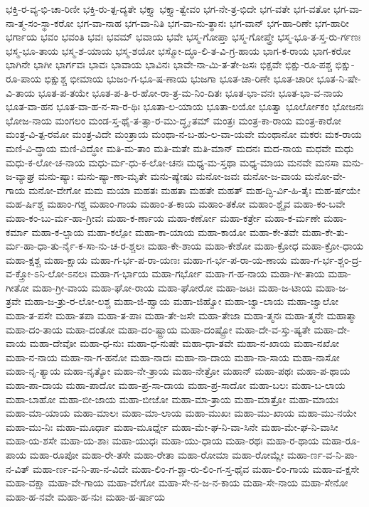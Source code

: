 {ಭಕ್ತಿ-ರ-ವ್ಯ-ಭಿ-ಚಾ-ರಿಣೀ
ಭಕ್ತಿ-ರು-ತ್ಪ-ದ್ಯತೇ
ಭಕ್ತ್ಯಾ
ಭಕ್ತ್ಯಾ-ತ್ವೇವಂ
ಭಗ-ನೇ-ತ್ರ-ಭಿದೇ
ಭಗ-ವತೇ
ಭಗ-ವತೋ
ಭಗ-ವಾ-ನಾ-ತ್ಮ-ಸಂ-ಸ್ಥಾ-ಕರೋ
ಭಗ-ವಾ-ನಾಹ
ಭಗ-ವಾ-ನಿತಿ
ಭಗ-ವಾ-ನು-ತ್ಥಾನಃ
ಭಗ-ವಾನ್
ಭಗ-ಹಾ-ರಿಣೇ
ಭಗ-ಹಾರೀ
ಭರ್ಗಾಯ
ಭವಂ
ಭವಂತಿ
ಭವಃ
ಭವಮ್
ಭವಾಯ
ಭವೇ
ಭಸ್ಮ-ಗೋಪ್ತಾ
ಭಸ್ಮ-ಗೋಪ್ತ್ರೇ
ಭಸ್ಮ-ಭೂ-ತ-ಸ್ತ-ರು-ರ್ಗಣಃ
ಭಸ್ಮ-ಭೂ-ತಾಯ
ಭಸ್ಮ-ಶ-ಯಾಯ
ಭಸ್ಮ-ಶಯೋ
ಭಸ್ಮೋ-ದ್ಧೂ-ಲಿ-ತ-ವಿ-ಗ್ರ-ಹಾಯ
ಭಾಗ-ಕ-ರಾಯ
ಭಾಗ-ಕರೋ
ಭಾಗಿನೇ
ಭಾಗೀ
ಭಾರ್ಗವಃ
ಭಾವಃ
ಭಾವಾಯ
ಭಾವಿನಃ
ಭಾವೇ-ನಾ-ಮಿ-ತ-ತೇ-ಜಸಃ
ಭಿಕ್ಷವೇ
ಭಿಕ್ಷು-ರೂ-ಪಶ್ಚ
ಭಿಕ್ಷು-ರೂ-ಪಾಯ
ಭಿಕ್ಷುಶ್ಚ
ಭೀಮಾಯ
ಭುಜಂ-ಗ-ಭೂ-ಷ-ಣಾಯ
ಭುಜಗಾ
ಭೂತ-ಚಾ-ರಿಣೇ
ಭೂತ-ಚಾರೀ
ಭೂತ-ನಿ-ಷೇ-ವಿ-ತಾಯ
ಭೂತ-ಪ-ತಯೇ
ಭೂತ-ಪ-ತಿ-ರ-ಹೋ-ರಾ-ತ್ರ-ಮ-ನಿಂ-ದಿತಃ
ಭೂತ-ಭಾ-ವನಃ
ಭೂತ-ಭಾ-ವ-ನಾಯ
ಭೂತ-ವಾ-ಹನ
ಭೂತ-ವಾ-ಹ-ನ-ಸಾ-ರ-ಥಿಃ
ಭೂತಾ-ಲ-ಯಾಯ
ಭೂತಾ-ಲಯೋ
ಭೂತ್ವಾ
ಭೂರ್ಲೋಕಂ
ಭೋಜನಃ
ಭೋಜ-ನಾಯ
ಮಂಗಲಂ
ಮಂಡ-ಸ್ತ-ಥೈ-ತ-ತ್ಸಾ-ರ-ಮು-ದ್ಧೃ-ತಮ್
ಮಂತ್ರಃ
ಮಂತ್ರ-ಕಾ-ರಾಯ
ಮಂತ್ರ-ಕಾರೋ
ಮಂತ್ರ-ವಿ-ತ್ಪ-ರಮೋ
ಮಂತ್ರ-ವಿದೇ
ಮಂತ್ರಾಯ
ಮಂಥಾ-ನ-ಬ-ಹು-ಲ-ವಾ-ಯವೇ
ಮಂಥಾನೋ
ಮಕರಃ
ಮಕ-ರಾಯ
ಮಣಿ-ವಿ-ದ್ಧಾಯ
ಮಣಿ-ವಿದ್ಧೋ
ಮತಿ-ಮ-ತಾಂ
ಮತಿ-ಮತೇ
ಮತಿ-ಮಾನ್
ಮದನಃ
ಮದ-ನಾಯ
ಮಧವೇ
ಮಧು
ಮಧು-ಕ-ಲೋ-ಚ-ನಾಯ
ಮಧು-ರ್ಮ-ಧು-ಕ-ಲೋ-ಚನಃ
ಮಧ್ಯ-ಮ-ಸ್ತಥಾ
ಮಧ್ಯ-ಮಾಯ
ಮನವೇ
ಮನಸಾ
ಮನು-ಜ-ವ್ಯಾಘ್ರ
ಮನು-ಷ್ಯಾಃ
ಮನು-ಷ್ಯಾ-ಣಾ-ಮೃತೇ
ಮನು-ಷ್ಯೇಷು
ಮನೋ-ಜವಃ
ಮನೋ-ಜ-ವಾಯ
ಮನೋ-ವೇ-ಗಾಯ
ಮನೋ-ವೇಗೋ
ಮಮ
ಮಯಾ
ಮಹತಃ
ಮಹತಾ
ಮಹತೇ
ಮಹತ್
ಮಹ-ದ್ಭಿ-ರ್ವಿ-ಹಿ-ತೈಃ
ಮಹ-ರ್ಷಯೇ
ಮಹ-ರ್ಷಿಶ್ಚ
ಮಹಾಂ-ಗಶ್ಚ
ಮಹಾಂ-ಗಾಯ
ಮಹಾಂ-ತ-ಕಾಯ
ಮಹಾಂ-ತಕೋ
ಮಹಾಂ-ಶ್ಚೈವ
ಮಹಾ-ಕಂ-ಬವೇ
ಮಹಾ-ಕಂ-ಬು-ರ್ಮ-ಹಾ-ಗ್ರೀವಃ
ಮಹಾ-ಕ-ರ್ಣಾಯ
ಮಹಾ-ಕರ್ಣೋ
ಮಹಾ-ಕರ್ತ್ರೇ
ಮಹಾ-ಕ-ರ್ಮಣೇ
ಮಹಾ-ಕರ್ಮಾ
ಮಹಾ-ಕ-ಲ್ಪಾಯ
ಮಹಾ-ಕಲ್ಪೋ
ಮಹಾ-ಕಾ-ಯಾಯ
ಮಹಾ-ಕಾಯೋ
ಮಹಾ-ಕೇ-ತವೇ
ಮಹಾ-ಕೇ-ತು-ರ್ಮ-ಹಾ-ಧಾ-ತು-ರ್ನೈ-ಕ-ಸಾ-ನು-ಚ-ರ-ಶ್ಚಲಃ
ಮಹಾ-ಕೇ-ಶಾಯ
ಮಹಾ-ಕೇಶೋ
ಮಹಾ-ಕ್ರೋಧ
ಮಹಾ-ಕ್ರೋ-ಧಾಯ
ಮಹಾ-ಕ್ಷಶ್ಚ
ಮಹಾ-ಕ್ಷಾಯ
ಮಹಾ-ಗ-ರ್ಭ-ಪ-ರಾ-ಯಣಃ
ಮಹಾ-ಗ-ರ್ಭ-ಪ-ರಾ-ಯ-ಣಾಯ
ಮಹಾ-ಗ-ರ್ಭ-ಶ್ಚಂ-ದ್ರ-ವ-ಕ್ತ್ರೋ-ಽನಿ-ಲೋ-ಽನಲಃ
ಮಹಾ-ಗ-ರ್ಭಾಯ
ಮಹಾ-ಗರ್ಭೋ
ಮಹಾ-ಗ-ಹ-ನಾಯ
ಮಹಾ-ಗೀ-ತಾಯ
ಮಹಾ-ಗೀತೋ
ಮಹಾ-ಗ್ರೀ-ವಾಯ
ಮಹಾ-ಘೋ-ರಾಯ
ಮಹಾ-ಘೋರೋ
ಮಹಾ-ಜಟಃ
ಮಹಾ-ಜ-ಟಾಯ
ಮಹಾ-ಜ-ತ್ರವೇ
ಮಹಾ-ಜ-ತ್ರು-ರ-ಲೋ-ಲಶ್ಚ
ಮಹಾ-ಜಿ-ಹ್ವಾಯ
ಮಹಾ-ಜಿಹ್ವೋ
ಮಹಾ-ಜ್ವಾ-ಲಾಯ
ಮಹಾ-ಜ್ವಾಲೋ
ಮಹಾ-ತ-ಪಸೇ
ಮಹಾ-ತಪಾ
ಮಹಾ-ತ-ಪಾಃ
ಮಹಾ-ತೇ-ಜಸೇ
ಮಹಾ-ತೇಜಾ
ಮಹಾ-ತ್ಮನಃ
ಮಹಾ-ತ್ಮನೇ
ಮಹಾತ್ಮಾ
ಮಹಾ-ದಂ-ತಾಯ
ಮಹಾ-ದಂತೋ
ಮಹಾ-ದಂ-ಷ್ಟ್ರಾಯ
ಮಹಾ-ದಂಷ್ಟ್ರೋ
ಮಹಾ-ದೇ-ವ-ಸ್ತು-ಷ್ಯತೇ
ಮಹಾ-ದೇ-ವಾಯ
ಮಹಾ-ದೇವೋ
ಮಹಾ-ಧ-ನುಃ
ಮಹಾ-ಧ-ನುಷೇ
ಮಹಾ-ಧಾ-ತವೇ
ಮಹಾ-ನ-ಖಾಯ
ಮಹಾ-ನಖೋ
ಮಹಾ-ನ-ನಾಯ
ಮಹಾ-ನಾ-ಗ-ಹನೋ
ಮಹಾ-ನಾದಃ
ಮಹಾ-ನಾ-ದಾಯ
ಮಹಾ-ನಾ-ಸಾಯ
ಮಹಾ-ನಾಸೋ
ಮಹಾ-ನೃ-ತ್ಯಾಯ
ಮಹಾ-ನೃತ್ಯೋ
ಮಹಾ-ನೇ-ತ್ರಾಯ
ಮಹಾ-ನೇತ್ರೋ
ಮಹಾನ್
ಮಹಾ-ಪಥಃ
ಮಹಾ-ಪ-ಥಾಯ
ಮಹಾ-ಪಾ-ದಾಯ
ಮಹಾ-ಪಾದೋ
ಮಹಾ-ಪ್ರ-ಸಾ-ದಾಯ
ಮಹಾ-ಪ್ರ-ಸಾದೋ
ಮಹಾ-ಬಲಃ
ಮಹಾ-ಬ-ಲಾಯ
ಮಹಾ-ಬಾಹೋ
ಮಹಾ-ಬೀ-ಜಾಯ
ಮಹಾ-ಬೀಜೋ
ಮಹಾ-ಮಾ-ತ್ರಾಯ
ಮಹಾ-ಮಾತ್ರೋ
ಮಹಾ-ಮಾಯಃ
ಮಹಾ-ಮಾ-ಯಾಯ
ಮಹಾ-ಮಾಲಃ
ಮಹಾ-ಮಾ-ಲಾಯ
ಮಹಾ-ಮುಖಃ
ಮಹಾ-ಮು-ಖಾಯ
ಮಹಾ-ಮು-ನಯೇ
ಮಹಾ-ಮು-ನಿಃ
ಮಹಾ-ಮೂರ್ಧಾ
ಮಹಾ-ಮೂರ್ಧ್ನೇ
ಮಹಾ-ಮೇ-ಘ-ನಿ-ವಾ-ಸಿನೇ
ಮಹಾ-ಮೇ-ಘ-ನಿ-ವಾಸೀ
ಮಹಾ-ಯ-ಶಸೇ
ಮಹಾ-ಯ-ಶಾಃ
ಮಹಾ-ಯುಧಃ
ಮಹಾ-ಯು-ಧಾಯ
ಮಹಾ-ರಥಃ
ಮಹಾ-ರ-ಥಾಯ
ಮಹಾ-ರೂ-ಪಾಯ
ಮಹಾ-ರೂಪೋ
ಮಹಾ-ರೇ-ತಸೇ
ಮಹಾ-ರೇತಾ
ಮಹಾ-ರೋಮಾ
ಮಹಾ-ರೋಮ್ಣೇ
ಮಹಾ-ರ್ಣ-ವ-ನಿ-ಪಾ-ನ-ವಿತ್
ಮಹಾ-ರ್ಣ-ವ-ನಿ-ಪಾ-ನ-ವಿದೇ
ಮಹಾ-ಲಿಂ-ಗ-ಶ್ಚಾ-ರು-ಲಿಂ-ಗ-ಸ್ತ-ಥೈವ
ಮಹಾ-ಲಿಂ-ಗಾಯ
ಮಹಾ-ವ-ಕ್ಷಸೇ
ಮಹಾ-ವಕ್ಷಾ
ಮಹಾ-ವೇ-ಗಾಯ
ಮಹಾ-ವೇಗೋ
ಮಹಾ-ಸೇ-ನ-ಜ-ನ-ಕಾಯ
ಮಹಾ-ಸೇ-ನಾಯ
ಮಹಾ-ಸೇನೋ
ಮಹಾ-ಹ-ನವೇ
ಮಹಾ-ಹ-ನುಃ
ಮಹಾ-ಹ-ರ್ಷಾಯ
}
